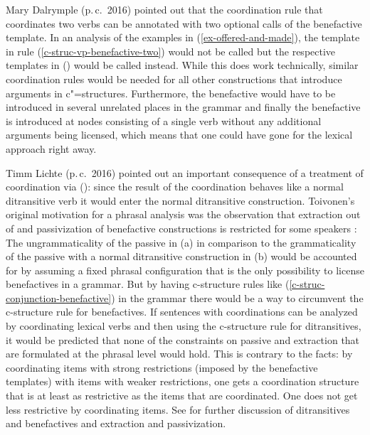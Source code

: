 Mary Dalrymple (p.\,c.\ 2016) pointed out that the coordination rule that coordinates two verbs can
be annotated with two optional calls of the benefactive template.
\ea
\label{c-struc-conjunction-benefactive}
\z
In an analysis of the examples in (\ref{ex-offered-and-made}), the template in rule
(\ref{c-struc-vp-benefactive-two}) would not be called but the respective templates in () would
be called instead. While this does work technically, similar coordination rules would be needed for all other
constructions that introduce arguments in c"=structures. Furthermore, the benefactive would have to
be introduced in several unrelated places in the grammar and finally the benefactive is introduced
at nodes consisting of a single verb without any additional arguments being licensed, which means
that one could have gone for the lexical approach right away. 

Timm Lichte (p.\,c.\ 2016) pointed out an important consequence of a treatment of coordination via (): since the result of the
coordination behaves like a normal ditransitive verb it would enter the normal ditransitive
construction. Toivonen's original motivation for a phrasal analysis was the observation that
extraction out of and passivization of benefactive constructions is restricted for some speakers \citep[]{Toivonen2013a}:
\eal
\label{ex-question-formation}
\zl
\eal
{}
\zl
The ungrammaticality of the passive in (a) in comparison to the grammaticality of the passive
with a normal ditransitive construction in (b) would be accounted for by assuming a fixed phrasal configuration that is the only possibility
to license benefactives in a grammar. But by having c-structure rules like
(\ref{c-struc-conjunction-benefactive}) in the grammar there would be a way to circumvent the
c-structure rule for benefactives. If sentences with coordinations can be analyzed by coordinating
lexical verbs and then using the c-structure rule for ditransitives, it would be predicted that none of the constraints on passive and extraction
that are formulated at the phrasal level would hold. This is contrary to the facts: by
coordinating items with strong restrictions (imposed by the benefactive templates) with items with weaker restrictions, one gets a
coordination structure that is at least as restrictive as the items that are coordinated. One does
not get less restrictive by coordinating items. See \citet{MuellerLFGphrasal} for further discussion
of ditransitives and benefactives and extraction and passivization.

